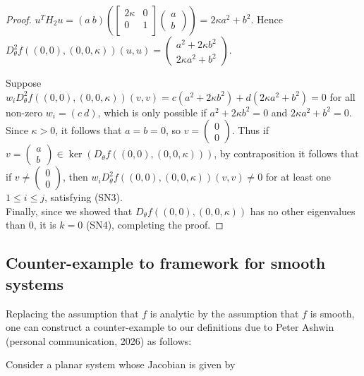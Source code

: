 \documentclass{article}
\theoremstyle{definition}
\begin{document}
\begin{refsection}
\begin{proof}
 $u^TH_2u=(a\ b)\left(\begin{bmatrix}
     2\kappa & 0 \\ 0 & 1 \\
 \end{bmatrix}\begin{pmatrix}
     a\\b
 \end{pmatrix}\right)=2\kappa a^2+b^2$. Hence $D_\theta^2f((0,0),(0,0,\kappa))(u,u)=\begin{pmatrix}
     a^2+2\kappa b^2\\2\kappa a^2+b^2
 \end{pmatrix}.$
 

Suppose $w_iD_\theta^2f((0,0),(0,0,\kappa))(v,v)= c(a^2+2\kappa b^2)+d(2\kappa a^2+b^2)=0$
for all non-zero $w_i = (c \ d)$, which is only possible if $a^2+2\kappa b^2=0$ and $2\kappa a^2+b^2=0$. Since $\kappa>0$, it follows that $a=b=0$, so $v=\begin{pmatrix} 0\\0 \end{pmatrix}$. Thus if $v = \begin{pmatrix}a\\b \end{pmatrix}\in \ker(D_{\theta} f((0,0),(0,0,\kappa)))$, by contraposition it follows that if $v \neq \begin{pmatrix} 0\\0\end{pmatrix}$, then $w_iD_\theta^2f((0,0),(0,0,\kappa))(v,v)\neq 0$ for at least one $1\leq i\leq j$, satisfying (SN3).\\

 Finally, since we showed that $D_{\theta} f((0,0),(0,0,\kappa))$ has no other eigenvalues than $0$, it is $k=0$ (SN4), completing the proof.
\end{proof}

\subsection{Counter-example to framework for smooth systems}\label{subsec:smoothnessIssue}

Replacing the assumption that $f$ is analytic by the assumption that $f$ is smooth, one can construct a counter-example to our definitions due to Peter Ashwin (personal communication, 2026) as follows:

Consider a planar system whose Jacobian is given by


\end{refsection}
\end{document}

